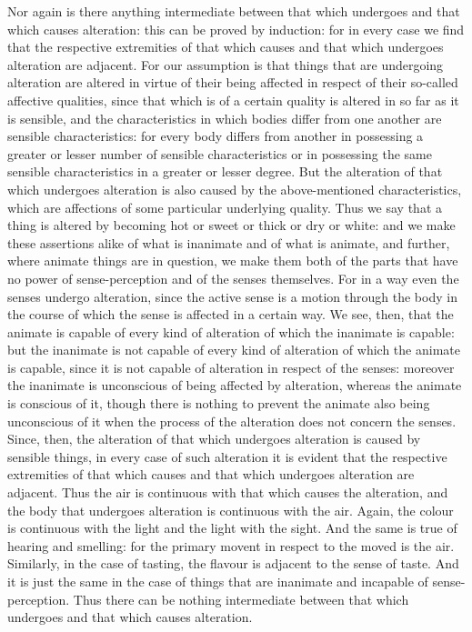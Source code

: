 Nor again is there anything intermediate between that which undergoes
and that which causes alteration: this can be proved by induction:
for in every case we find that the respective extremities of that
which causes and that which undergoes alteration are adjacent. For
our assumption is that things that are undergoing alteration are altered
in virtue of their being affected in respect of their so-called affective
qualities, since that which is of a certain quality is altered in
so far as it is sensible, and the characteristics in which bodies
differ from one another are sensible characteristics: for every body
differs from another in possessing a greater or lesser number of sensible
characteristics or in possessing the same sensible characteristics
in a greater or lesser degree. But the alteration of that which undergoes
alteration is also caused by the above-mentioned characteristics,
which are affections of some particular underlying quality. Thus we
say that a thing is altered by becoming hot or sweet or thick or dry
or white: and we make these assertions alike of what is inanimate
and of what is animate, and further, where animate things are in question,
we make them both of the parts that have no power of sense-perception
and of the senses themselves. For in a way even the senses undergo
alteration, since the active sense is a motion through the body in
the course of which the sense is affected in a certain way. We see,
then, that the animate is capable of every kind of alteration of which
the inanimate is capable: but the inanimate is not capable of every
kind of alteration of which the animate is capable, since it is not
capable of alteration in respect of the senses: moreover the inanimate
is unconscious of being affected by alteration, whereas the animate
is conscious of it, though there is nothing to prevent the animate
also being unconscious of it when the process of the alteration does
not concern the senses. Since, then, the alteration of that which
undergoes alteration is caused by sensible things, in every case of
such alteration it is evident that the respective extremities of that
which causes and that which undergoes alteration are adjacent. Thus
the air is continuous with that which causes the alteration, and the
body that undergoes alteration is continuous with the air. Again,
the colour is continuous with the light and the light with the sight.
And the same is true of hearing and smelling: for the primary movent
in respect to the moved is the air. Similarly, in the case of tasting,
the flavour is adjacent to the sense of taste. And it is just the
same in the case of things that are inanimate and incapable of sense-perception.
Thus there can be nothing intermediate between that which undergoes
and that which causes alteration. 

